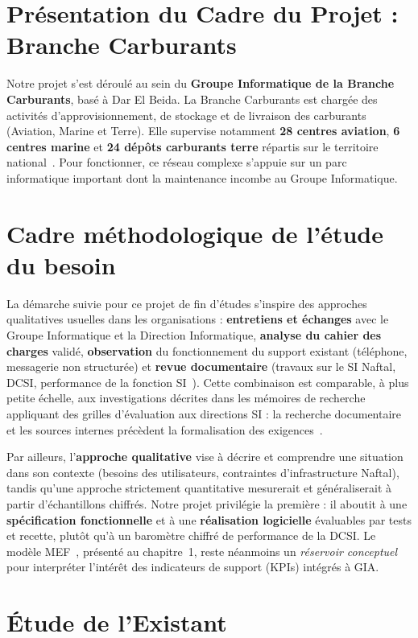 \section{Présentation du Cadre du Projet : Branche Carburants}
Notre projet s'est déroulé au sein du \textbf{Groupe Informatique de la Branche
Carburants}, basé à Dar El Beida. La Branche Carburants est chargée des activités
d'approvisionnement, de stockage et de livraison des carburants (Aviation, Marine et Terre).
Elle supervise notamment \textbf{28 centres aviation}, \textbf{6 centres marine} et
\textbf{24 dépôts carburants terre} répartis sur le territoire national~\cite{ingrachen2016}.
Pour fonctionner, ce réseau complexe s'appuie sur un parc informatique important dont la
maintenance incombe au Groupe Informatique.

\section{Cadre méthodologique de l'étude du besoin}
La démarche suivie pour ce projet de fin d'études s'inspire des approches qualitatives usuelles
dans les organisations : \textbf{entretiens et échanges} avec le Groupe Informatique et la
Direction Informatique, \textbf{analyse du cahier des charges} validé, \textbf{observation} du
fonctionnement du support existant (téléphone, messagerie non structurée) et \textbf{revue
documentaire} (travaux sur le SI Naftal, DCSI, performance de la fonction
SI~\cite{ssiouani2010,meghari2014,ingrachen2016}). Cette combinaison est comparable, à plus petite
échelle, aux investigations décrites dans les mémoires de recherche appliquant des grilles
d'évaluation aux directions SI : la recherche documentaire et les sources internes précèdent la
formalisation des exigences~\cite{meghari2014}.

Par ailleurs, l'\textbf{approche qualitative} vise à décrire et comprendre une situation dans son
contexte (besoins des utilisateurs, contraintes d'infrastructure Naftal), tandis qu'une approche
strictement quantitative mesurerait et généraliserait à partir d'échantillons chiffrés. Notre
projet privilégie la première : il aboutit à une \textbf{spécification fonctionnelle} et à une
\textbf{réalisation logicielle} évaluables par tests et recette, plutôt qu'à un baromètre
chiffré de performance de la DCSI. Le modèle MEF~\cite{autissier2008}, présenté au chapitre~1,
reste néanmoins un \emph{réservoir conceptuel} pour interpréter l'intérêt des indicateurs de
support (KPIs) intégrés à GIA.

\section{Étude de l'Existant}

